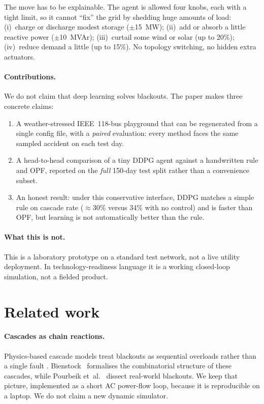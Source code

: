 \documentclass[11pt,a4paper]{article}
\begin{document}
The move has to be explainable.
The agent is allowed four knobs, each with a tight limit, so it cannot ``fix'' the grid by shedding huge amounts of load:
(i)~charge or discharge modest storage ($\pm$15~MW);
(ii)~add or absorb a little reactive power ($\pm$10~MVAr);
(iii)~curtail some wind or solar (up to 20\%);
(iv)~reduce demand a little (up to 15\%).
No topology switching, no hidden extra actuators.

\paragraph{Contributions.}
We do not claim that deep learning solves blackouts.
The paper makes three concrete claims:
\begin{enumerate}
\item A weather-stressed IEEE~118-bus playground that can be regenerated from a single config file, with a \emph{paired} evaluation: every method faces the same sampled accident on each test day.
\item A head-to-head comparison of a tiny DDPG agent \citep{lillicrap2016ddpg} against a handwritten rule and OPF, reported on the \emph{full} 150-day test split rather than a convenience subset.
\item An honest result: under this conservative interface, DDPG matches a simple rule on cascade rate ($\approx$30\% versus 34\% with no control) and is faster than OPF, but learning is not automatically better than the rule.
\end{enumerate}

\paragraph{What this is not.}
This is a laboratory prototype on a standard test network, not a live utility deployment.
In technology-readiness language it is a working closed-loop simulation, not a fielded product.

\section{Related work}

\paragraph{Cascades as chain reactions.}
Physics-based cascade models treat blackouts as sequential overloads rather than a single fault \citep{dobson2007chaos,carreras2002critical}.
Bienstock~\citep{bienstock2016cascades} formalises the combinatorial structure of these cascades, while Pourbeik et~al.~\citep{pourbeik2006anatomy} dissect real-world blackouts.
We keep that picture, implemented as a short AC power-flow loop, because it is reproducible on a laptop.
We do not claim a new dynamic simulator.
\end{document}
